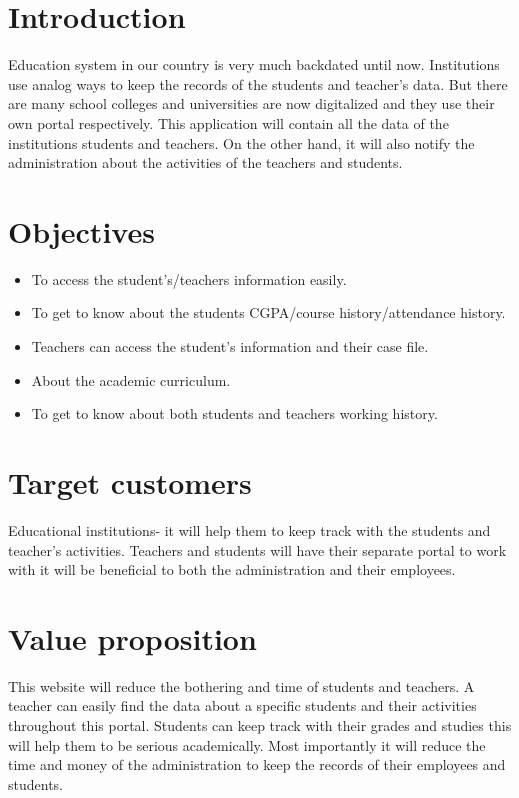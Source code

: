 \documentclass[a4paper,12pt]{article}
\begin{document}
\section{Introduction}
Education system in our country is very much backdated until now. Institutions use analog ways   to keep the records of the students and teacher’s data. But there are many school colleges and universities are now digitalized and they use their own portal respectively. This application will contain all the data of the institutions students and teachers. On the other hand, it will also notify the administration about the activities of the teachers and students. 

\section{Objectives}
\begin{itemize}
\item To access the student’s/teachers information easily.

\item To get to know about the students CGPA/course history/attendance              history.

\item Teachers can access the student’s information and their case file.

\item About the academic curriculum.

\item To get to know about both students and teachers working history.
\end{itemize}
\section{ Target customers }
	Educational institutions- it will help them to keep track with the students and teacher’s activities. Teachers and students will have their separate portal to work with it will be beneficial to both the administration and their employees. 

\section{Value proposition}
This website will reduce the bothering and time of students and teachers. A teacher can easily find the data about a specific students and their activities throughout this portal. Students can keep track with their grades and studies this will help them to be serious academically. Most importantly it will reduce the time and money of the administration to keep the records of their employees and students.
\end{document}
